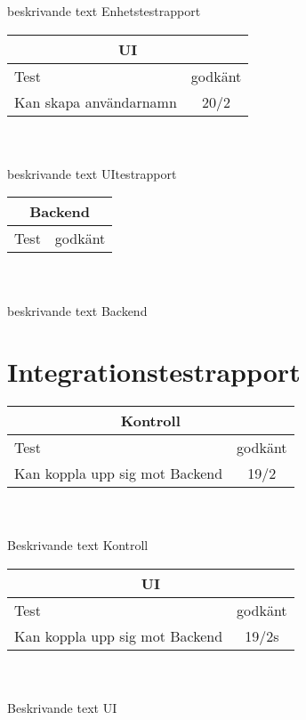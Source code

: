 \documentclass[10pt]{article}
\begin{document}
  beskrivande text Enhetstestrapport
  \\
  
  \noindent
    \begin{tabular}{|l| c|}
    \hline
    \multicolumn{2}{|c|}{UI}\\
    \hline
    Test&godkänt\\
   \hline
   Kan skapa användarnamn&20/2\\
   \hline
   
  \end{tabular}
  \\
  \\
  beskrivande text UItestrapport
\\

  \noindent
\begin{tabular}{|l| c|}
  \hline
    \multicolumn{2}{|c|}{Backend}\\
    \hline
    Test&godkänt\\
   \hline
   
   
  \end{tabular}
  \\
  \\
  beskrivande text Backend
  \\
\section{Integrationstestrapport}
  \begin{tabular}{|l| c|}
  \hline
    \multicolumn{2}{|c|}{Kontroll}\\
    \hline
    Test&godkänt\\
   \hline
   Kan koppla upp sig mot Backend&19/2\\
   \hline
   
  \end{tabular}
  \\
  \\
  Beskrivande text Kontroll
  \\
  \noindent
\begin{tabular}{|l| c|}
  \hline
    \multicolumn{2}{|c|}{UI}\\
    \hline
    Test&godkänt\\
    \hline
    Kan koppla upp sig mot Backend&19/2s\\
    \hline
   
  \end{tabular}
  \\
  \\
  Beskrivande text UI
  \\
\end{document}
